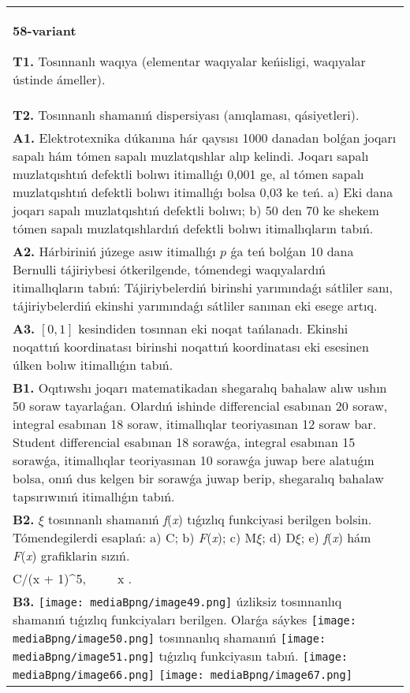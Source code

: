 \documentclass{article}
\begin{document}
\begin{tabular}{m{17cm}}
\textbf{58-variant}
\newline

\textbf{T1.} Tosınnanlı waqıya (elementar waqıyalar keńisligi, waqıyalar ústinde ámeller).
 \\
\textbf{T2.} Tosınnanlı shamanıń dispersiyası (anıqlaması, qásiyetleri).
 \\
\textbf{A1.} Elektrotexnika dúkanına hár qaysısı 1000 danadan bolǵan joqarı sapalı hám tómen sapalı muzlatqıshlar alıp kelindi. Joqarı sapalı muzlatqıshtıń defektli bolıwı itimallıǵı 0,001 ge, al tómen sapalı muzlatqıshtıń defektli bolıwı itimallıǵı bolsa 0,03 ke teń. a) Eki dana joqarı sapalı muzlatqıshtıń defektli bolıwı; b) 50 den 70 ke shekem tómen sapalı muzlatqıshlardıń defektli bolıwı itimallıqların tabıń.
 \\
\textbf{A2.} Hárbiriniń júzege asıw itimallıǵı $p$ ǵa teń bolǵan 10 dana Bernulli tájiriybesi ótkerilgende, tómendegi waqıyalardıń itimallıqların tabıń: Tájiriybelerdiń birinshi yarımındaǵı sátliler sanı, tájiriybelerdiń ekinshi yarımındaǵı sátliler sanınan eki esege artıq.
 \\
\textbf{A3.} $\left[ 0,1 \right]$ kesindiden tosınnan eki noqat tańlanadı. Ekinshi noqattıń koordinatası birinshi noqattıń koordinatası eki esesinen úlken bolıw itimallıǵın tabıń.
 \\
\textbf{B1.} Oqıtıwshı joqarı matematikadan shegaralıq bahalaw alıw ushın 50 soraw tayarlaǵan. Olardıń ishinde differencial esabınan 20 soraw, integral esabınan 18 soraw, itimallıqlar teoriyasınan 12 soraw bar. Student differencial esabınan 18 sorawǵa, integral esabınan 15 sorawǵa, itimallıqlar teoriyasınan 10 sorawǵa juwap bere alatuǵın bolsa, onıń dus kelgen bir sorawǵa juwap berip, shegaralıq bahalaw tapsırıwınıń itimallıǵın tabıń.
 \\
\textbf{B2.} $\xi$ tosınnanlı shamanıń \emph{f}(\emph{x}) tıǵızlıq funkciyasi berilgen bolsin. Tómendegilerdi esaplań: a) C; b) \emph{F}(\emph{x}); c) M$\xi$; d) D$\xi$; e) \emph{f}(\emph{x}) hám \emph{F}(\emph{x}) grafiklarin sızıń.\(f(x) = \left\{ \begin{matrix}
\ \ \ \ \ \ \ \ 0,\ \ \ \ \ \ x < 0, \\
C/(x + 1)^{5},\ \ \ \ \ x \geq 0.\ \ 
\end{matrix} \right.\ \)
 \\
\textbf{B3.} \texttt{[image: mediaBpng/image49.png]} úzliksiz tosınnanlıq shamanıń tıǵızlıq funkciyaları berilgen. Olarǵa sáykes \texttt{[image: mediaBpng/image50.png]} tosınnanlıq shamanıń \texttt{[image: mediaBpng/image51.png]} tıǵızlıq funkciyasın tabıń. \texttt{[image: mediaBpng/image66.png]} \texttt{[image: mediaBpng/image67.png]}

\end{tabular}
\end{document}
